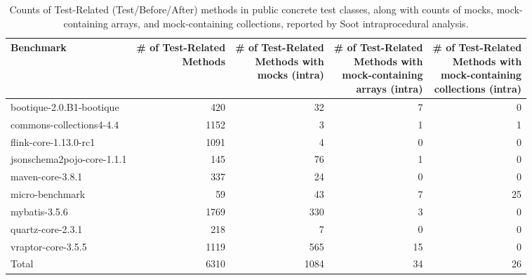 \begin{table*}
	\centering
	\caption{Counts of Test-Related (Test/Before/After) methods in public concrete test classes, along with counts of mocks, mock-containing arrays, and mock-containing collections, reported by Soot intraprocedural analysis.}
	\begin{tabular}{lrrrr}
		\toprule
		Benchmark & \thead{\# of Test-Related \\ Methods} & \thead{\# of Test-Related \\ Methods with \\ mocks (intra)}  & \thead{\# of Test-Related \\ Methods with \\ mock-containing\\ arrays (intra)} & \thead{\# of Test-Related \\ Methods with \\ mock-containing\\ collections (intra)} \\
		\midrule
		bootique-2.0.B1-bootique           		&  420        &  32  & 7 & 0       \\
		commons-collections4-4.4          		&  1152       &  3   & 1 & 1       \\
		flink-core-1.13.0-rc1           		&  1091       &  4   & 0 & 0       \\
		jsonschema2pojo-core-1.1.1           	&  145        &  76  & 1 & 0       \\
		maven-core-3.8.1	           			&  337        &  24  & 0 & 0       \\
		micro-benchmark         		  		&  59         &  43  & 7 & 25       \\
		mybatis-3.5.6         		  			&  1769       &  330 & 3 & 0       \\
		
		quartz-core-2.3.1         	  			&  218     	  &  7   & 0 & 0      \\
		vraptor-core-3.5.5         	  			&  1119       &  565 & 15 & 0      \\
		\bottomrule
		Total        	  						&  6310       &  1084  & 34 & 26    \\
	\end{tabular}
	\label{tab:mocks}
\end{table*}

